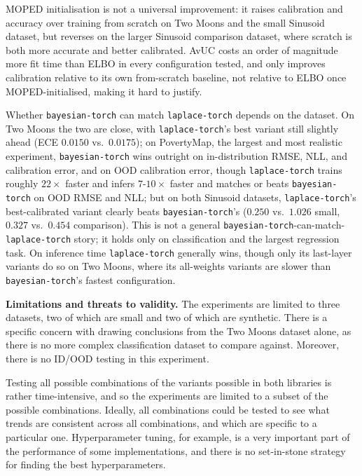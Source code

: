 \documentclass[conference]{IEEEtran}
\begin{document}
MOPED initialisation is not a universal improvement: it raises calibration and accuracy over
training from scratch on Two Moons and the small Sinusoid dataset, but reverses on the
larger Sinusoid comparison dataset, where scratch is both more accurate and better
calibrated. AvUC costs an order of magnitude more fit time than ELBO in every configuration
tested, and only improves calibration relative to its own from-scratch baseline, not
relative to ELBO once MOPED-initialised, making it hard to justify.

Whether \texttt{bayesian-torch} can match \texttt{laplace-torch} depends on the dataset. On
Two Moons the two are close, with \texttt{laplace-torch}'s best variant still slightly ahead
(ECE $0.0150$ vs.\ $0.0175$); on PovertyMap, the largest and most realistic experiment,
\texttt{bayesian-torch} wins outright on in-distribution RMSE, NLL, and calibration error,
and on OOD calibration error, though \texttt{laplace-torch} trains roughly $22\times$ faster
and infers $7$-$10\times$ faster and matches or beats \texttt{bayesian-torch} on OOD RMSE
and NLL; but on both Sinusoid datasets, \texttt{laplace-torch}'s best-calibrated variant
clearly beats \texttt{bayesian-torch}'s ($0.250$ vs.\ $1.026$ small, $0.327$ vs.\ $0.454$
comparison). This is not a general \texttt{bayesian-torch}-can-match-\texttt{laplace-torch}
story; it holds only on classification and the largest regression task. On inference time
\texttt{laplace-torch} generally wins, though only its last-layer variants do so on Two
Moons, where its all-weights variants are slower than \texttt{bayesian-torch}'s fastest
configuration.

\textbf{Limitations and threats to validity.} The experiments are limited to three
datasets, two of which are small and two of which are synthetic. There is a specific
concern with drawing conclusions from the Two Moons dataset alone, as there is no more
complex classification dataset to compare against. Moreover, there is no ID/OOD testing in
this experiment.

Testing all possible combinations of the variants possible in both libraries is rather
time-intensive, and so the experiments are limited to a subset of the possible
combinations. Ideally, all combinations could be tested to see what trends are consistent
across all combinations, and which are specific to a particular one. Hyperparameter tuning,
for example, is a very important part of the performance of some implementations, and there
is no set-in-stone strategy for finding the best hyperparameters.
\end{document}
